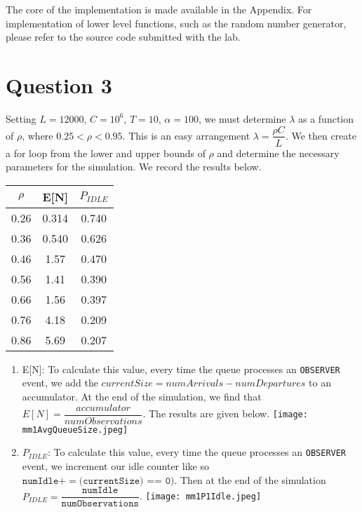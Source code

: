 \documentclass{article}
\begin{document}
The core of the implementation is made available in the Appendix. For implementation of lower level functions, such as the random number generator, please refer
to the source code submitted with the lab.

\section{Question 3}

Setting $L=12000$, $C=10^6$, $T = 10$, $\alpha = 100$, we must determine $\lambda$ as a function of $\rho$, where $0.25 < \rho < 0.95$.
This is an easy arrangement $\lambda = \dfrac{\rho C}{L}$. We then create a for loop from the lower and upper bounds of $\rho$ and determine
the necessary parameters for the simulation. We record the results below.

\begin{center}
    \begin{tabular}{||c c c||}
    \hline
    $\rho$ & E[N] & $P_{IDLE}$ \\ [0.5ex]
    \hline\hline
    0.26 & 0.314 & 0.740 \\
    \hline
    0.36 & 0.540 & 0.626  \\
    \hline
    0.46 & 1.57 & 0.470  \\
    \hline
    0.56 & 1.41 & 0.390  \\
    \hline
    0.66 & 1.56 & 0.397  \\ [1ex]
    \hline
    0.76 & 4.18 & 0.209  \\ [1ex]
    \hline
    0.86 & 5.69 & 0.207  \\ [1ex]
    \hline
    \end{tabular}
\end{center}

\begin{enumerate}
    \item E[N]: To calculate this value, every time the queue processes an \texttt{OBSERVER} event, we add the $currentSize = numArrivals - numDepartures$
    to an accumulator. At the end of the simulation, we find that $E[N] = \dfrac{accumulator}{numObservations}$. The results are given below. \newline
    \texttt{[image: mm1AvgQueueSize.jpeg]}

    \item $P_{IDLE}$: To calculate this value, every time the queue processes an \texttt{OBSERVER} event, we increment our idle counter like so
    $\texttt{numIdle} += (\texttt{currentSize) == 0)}$. Then at the end of the simulation $P_{IDLE} = \dfrac{\texttt{numIdle}}{\texttt{numObservations}}$. \newline
    \texttt{[image: mm1P1Idle.jpeg]}
\end{enumerate}
\end{document}
